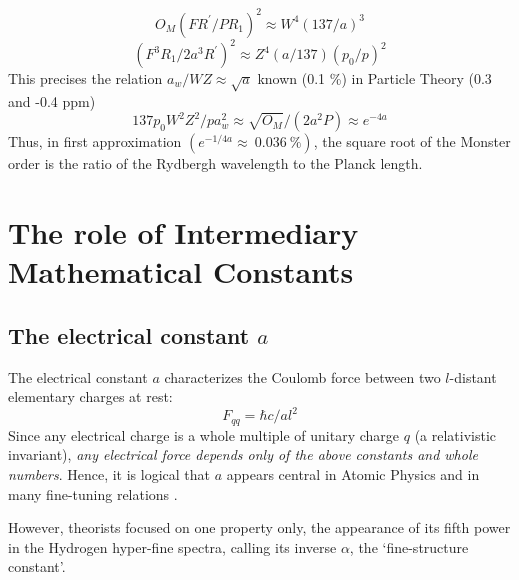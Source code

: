 \documentclass[twoside,draft]{article}
\begin{document}
\begin{sloppypar}
\begin{equation}
O_M (FR^{\prime}/PR_1)^2 \approx W^4 (137/a)^3
\end{equation}
\begin{equation}
 (F^3R_1 / 2 a^3R^{\prime})^2 \approx Z^4 (a/137)(p_0/p)^2
\end{equation}
This precises the relation $a_w/WZ \approx \sqrt{a}$ known (0.1 \%) in Particle Theory (0.3 and -0.4 ppm)
\begin{equation}
137 p_0 W^2 Z^2/p a_w^2 \approx \sqrt{O_M}/(2a^2 P) \approx e^{-4a}
\end{equation}   
Thus, in first approximation $(e^{-1/4a} \approx ~0.036 ~\%)$, the square root of the Monster order is the ratio of the Rydbergh wavelength to the Planck length.







\section{The role of Intermediary Mathematical Constants}

\subsection{The electrical constant $a$}
The electrical constant $a$ characterizes the Coulomb force between two $l$-distant elementary charges at rest:
\begin{equation}
F_{qq} =\hbar c/al^{2}    
\end{equation}
Since any electrical charge is a whole multiple of unitary charge $q$ (a relativistic invariant), \textit{any electrical force depends only of the above constants and whole numbers}. Hence, it is logical that $a$ appears central in Atomic Physics and in many fine-tuning relations \cite{Carr}.

However, theorists focused on one property only, the appearance of its fifth power in the Hydrogen hyper-fine spectra, calling its inverse $\alpha$, the `fine-structure constant'. 


\end{sloppypar}
\end{document}
